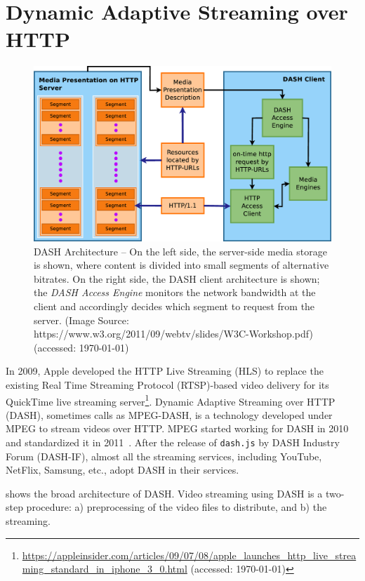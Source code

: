 \section{Dynamic Adaptive Streaming over HTTP}
\begin{figure}[!t]
	\centering
	\includegraphics[scale=0.25]{img/dash-arch}
	\caption{\small{DASH Architecture -- On the left side, the server-side media storage is shown, where content is divided into small segments of alternative bitrates. On the right side, the DASH client architecture is shown; the {\it DASH Access Engine} monitors the network bandwidth at the client and accordingly decides which segment to request from the server. (Image Source: https://www.w3.org/2011/09/webtv/slides/W3C-Workshop.pdf) (accessed: \today)}}
	\label{fig:dash}
\end{figure}
In 2009, Apple developed the HTTP Live Streaming (HLS) to replace the existing Real Time Streaming Protocol (RTSP)-based video delivery for its QuickTime live streaming server\footnote{\url{https://appleinsider.com/articles/09/07/08/apple_launches_http_live_streaming_standard_in_iphone_3_0.html} (accessed: \today)}. Dynamic Adaptive Streaming over HTTP (DASH), sometimes calls as MPEG-DASH, is a technology developed under MPEG to stream videos over HTTP. MPEG started working for DASH in 2010 and standardized it in 2011~\cite{ISO/IEC23009-1:2019}. After the release of {\tt dash.js} by DASH Industry Forum (DASH-IF), almost all the streaming services, including YouTube, NetFlix, Samsung, etc., adopt DASH in their services.

\fig{\ref{fig:dash}} shows the broad architecture of DASH. Video streaming using DASH is a two-step procedure: a) preprocessing of the video files to distribute, and b) the streaming. 


